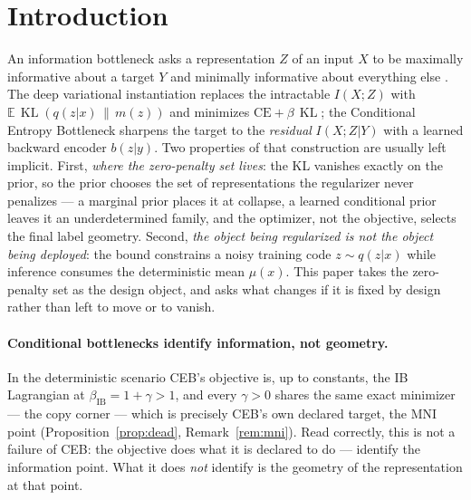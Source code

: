 \documentclass{article} %
\newcommand{\KLd}{\operatorname{KL}}
\newcommand{\CE}{\mathrm{CE}}
\begin{document}
\section{Introduction}

An information bottleneck asks a representation $Z$ of an input $X$ to be maximally
informative about a target $Y$ and minimally informative about everything else
\citep{tishby1999ib}. The deep variational instantiation
\citep{alemi2017vib} replaces the intractable $I(X;Z)$ with
$\mathbb{E}\,\KLd(q(z|x)\,\|\,m(z))$ and minimizes $\CE + \beta\,\KLd$; the Conditional
Entropy Bottleneck \citep{fischer2020ceb} sharpens the target to the \emph{residual}
$I(X;Z|Y)$ with a learned backward encoder $b(z|y)$. Two properties of that
construction are usually left implicit. First, \emph{where the zero-penalty set
lives}: the KL vanishes exactly on the prior, so the prior chooses the set of
representations the regularizer never penalizes --- a marginal prior places it at
collapse, a learned conditional prior leaves it an underdetermined family, and the
optimizer, not the objective, selects the final label geometry. Second, \emph{the
object being regularized is not the object being deployed}: the bound constrains a
noisy training code $z \sim q(z|x)$ while inference consumes the deterministic mean
$\mu(x)$. This paper takes the zero-penalty set as the design object, and asks what
changes if it is fixed by design rather than left to move or to vanish.

\paragraph{Conditional bottlenecks identify information, not geometry.}
In the deterministic scenario CEB's objective is, up to constants, the IB Lagrangian at
$\beta_{\mathrm{IB}} = 1 + \gamma > 1$, and every $\gamma > 0$ shares the same exact
minimizer --- the copy corner --- which is precisely CEB's own declared target, the MNI
point (Proposition~\ref{prop:dead}, Remark~\ref{rem:mni}). Read correctly, this is not
a failure of CEB: the objective does what it is declared to do --- identify the
information point. What it does \emph{not} identify is the geometry of the
representation at that point.
\end{document}
